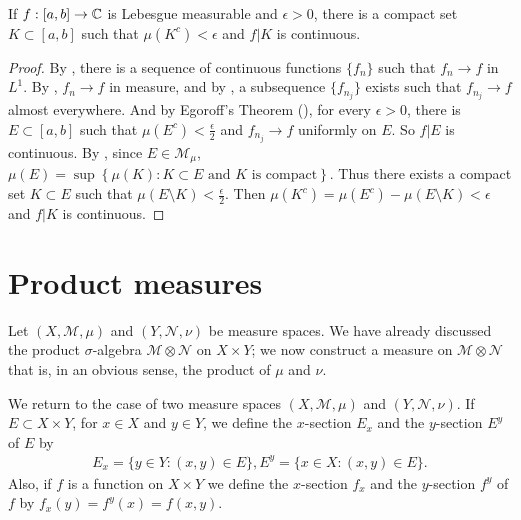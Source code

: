 \begin{theorem}
    If $f: [a, b] \to \mathbb{C}$ is Lebesgue measurable and $\epsilon > 0$, there is a compact set $K \subset [a, b]$ such that $\mu(K^c) < \epsilon$ and $f|K$ is continuous.
\end{theorem}

\begin{proof}
    By , there is a sequence of continuous functions $\{ f_n \}$ such that $f_n \to f$ in $L^1$.
    By , $f_n \to f$ in measure, and by , a subsequence $\{ f_{n_j} \}$ exists such that $f_{n_j} \to f$ almost everywhere.
    And by Egoroff's Theorem (), for every $\epsilon > 0$, there is $E \subset [a, b]$ such that $\mu(E^c) < \frac{\epsilon}{2}$ and $f_{n_j} \to f$ uniformly on $E$.
    So $f|E$ is continuous.
    By , since $E \in \mathcal{M}_{\mu}$, $\mu(E) = \sup \left\{ \mu(K): K \subset E \text{ and } K \text{ is compact} \right\}$.
    Thus there exists a compact set $K \subset E$ such that $\mu(E \setminus K) < \frac{\epsilon}{2}$.
    Then $\mu(K^c) = \mu(E^c) - \mu(E \setminus K) < \epsilon$ and $f|K$ is continuous.
\end{proof}

\section{Product measures}

Let $(X, \mathcal{M}, \mu)$ and  $(Y, \mathcal{N}, \nu)$ be measure spaces. 
We have already discussed the product $\sigma$-algebra $\mathcal{M} \otimes \mathcal{N}$ on $X \times Y$; 
we now construct a measure on $\mathcal{M} \otimes \mathcal{N}$ that is, in an obvious sense, the product of $\mu$ and $\nu$.


We return to the case of two measure spaces $(X, \mathcal{M}, \mu)$ and  $(Y, \mathcal{N}, \nu)$.
If $E \subset X \times Y$, for $x \in X$ and $y \in Y$, we define the $x$-section $E_x$ and the $y$-section $E^y$ of $E$ by
\begin{align}
    E_x = \{ y \in Y: (x, y) \in E \},
    E^y = \{ x \in X: (x, y) \in E \}.
\end{align}
Also, if $f$ is a function on $X \times Y$ we define the $x$-section $f_x$ and the $y$-section $f^y$ of $f$ by $f_x(y) = f^y(x) = f(x, y)$.

